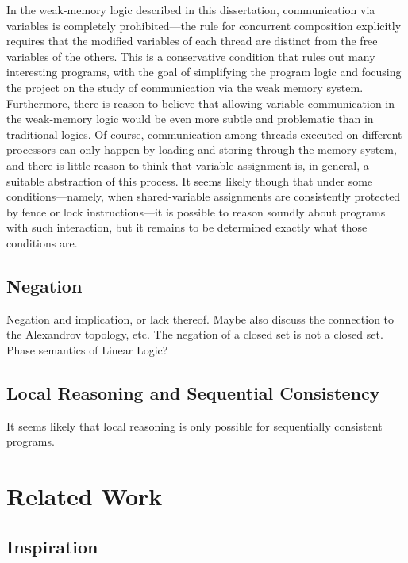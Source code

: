 \documentclass[11pt]{report}
\begin{document}
In the weak-memory logic described in this dissertation, communication via variables is completely prohibited---the rule for concurrent composition explicitly requires that the modified variables of each thread are distinct from the free variables of the others. This is a conservative condition that rules out many interesting programs, with the goal of simplifying the program logic and focusing the project on the study of communication via the weak memory system. Furthermore, there is reason to believe that allowing variable communication in the weak-memory logic would be even more subtle and problematic than in traditional logics. Of course, communication among threads executed on different processors can only happen by loading and storing through the memory system, and there is little reason to think that variable assignment is, in general, a suitable abstraction of this process. It seems likely though that under some conditions---namely, when shared-variable assignments are consistently protected by fence or lock instructions---it is possible to reason soundly about programs with such interaction, but it remains to be determined exactly what those conditions are. 

\section{Negation}
    
Negation and implication, or lack thereof. Maybe also discuss the connection to the Alexandrov topology, etc. The negation of a closed set is not a closed set. Phase semantics of Linear Logic? 



\section{Local Reasoning and Sequential Consistency}

It seems likely that local reasoning is only possible for sequentially consistent programs. 

\chapter{Related Work}

\section{Inspiration}
\end{document}

